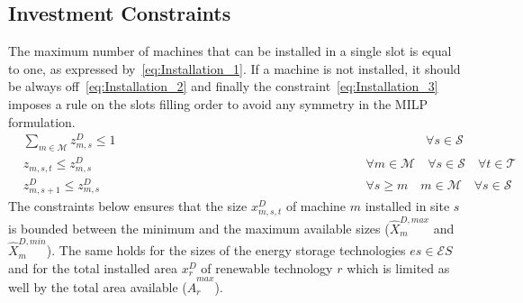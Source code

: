 \documentclass{article}
\newcommand{\cT}{{\mathcal T}}
\newcommand{\cM}{{\mathcal M}}
\newcommand{\cS}{{\mathcal S}}
\newcommand{\cES}{{\mathcal ES}}
\begin{document}
{\subsection{Investment Constraints}
The maximum number of machines that can be installed in a single slot is equal to one, as expressed by~\eqref{eq:Installation_1}. If a machine is not installed, it should be always off~\eqref{eq:Installation_2} and finally the constraint~\eqref{eq:Installation_3} imposes a rule on the slots filling order to avoid any symmetry in the MILP formulation. 
		\begin{align}
		& \sum_{m \in \cM} z_{m,s}^{D} \leq 1 & \hspace{10cm} \forall s \in \cS \label{eq:Installation_1}\\
		& z_{m,s,t} \leq z_{m,s}^D & \hspace{8cm} \forall m \in \cM \quad \forall s \in \cS \quad \forall t \in \cT \label{eq:Installation_2}\\
		& z_{m,s+1}^D \leq z_{m,s}^D & \hspace{8cm} \forall s \geq m \quad m \in \cM \quad \forall s \in \cS \label{eq:Installation_3}
		\end{align}
The constraints below ensures that the size $x_{m,s,t}^D$ of machine $m$ installed in site $s$ is bounded between the minimum and the maximum available sizes ($\hat{X}_{m}^{D, max}$ and $\hat{X}_{m}^{D, min}$). The same holds for the sizes of the energy storage technologies $es \in \cES$ and for the total installed area $x_r^D$ of renewable technology $r$ which is limited as well by the total area available ($\hat{A}_{r}^{max}$).

}
\end{document}
